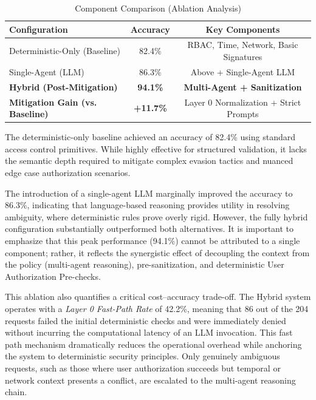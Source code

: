 \documentclass[
]{ceurart}
\begin{document}
\begin{table}[htbp]
    \centering
    \caption{Component Comparison (Ablation Analysis)}
    \label{tab:ablation}
    \begin{tabular}{lcc}
        \toprule
        \textbf{Configuration}        & \textbf{Accuracy} & \textbf{Key Components}          \\
        \midrule
        Deterministic-Only (Baseline) & 82.4\%            & RBAC, Time, Network, Basic Signatures \\
        Single-Agent (LLM)            & 86.3\%            & Above + Single-Agent LLM         \\
        \textbf{Hybrid (Post-Mitigation)} & \textbf{94.1\%}   & \textbf{Multi-Agent + Sanitization} \\
        \midrule
        \textbf{Mitigation Gain (vs. Baseline)} & \textbf{+11.7\%} & Layer 0 Normalization + Strict Prompts \\
        \bottomrule
    \end{tabular}
\end{table}

The deterministic-only baseline achieved an accuracy of 82.4\% using standard access control primitives. While highly effective for structured validation, it lacks the semantic depth required to mitigate complex evasion tactics and nuanced edge case authorization scenarios.

The introduction of a single-agent LLM marginally improved the accuracy to 86.3\%, indicating that language-based reasoning provides utility in resolving ambiguity, where deterministic rules prove overly rigid. However, the fully hybrid configuration substantially outperformed both alternatives. It is important to emphasize that this peak performance (94.1\%) cannot be attributed to a single component; rather, it reflects the synergistic effect of decoupling the context from the policy (multi-agent reasoning), pre-sanitization, and deterministic User Authorization Pre-checks.

This ablation also quantifies a critical cost--accuracy trade-off. The Hybrid system operates with a \textit{Layer 0 Fast-Path Rate} of 42.2\%, meaning that 86 out of the 204 requests failed the initial deterministic checks and were immediately denied without incurring the computational latency of an LLM invocation. This fast path mechanism dramatically reduces the operational overhead while anchoring the system to deterministic security principles. Only genuinely ambiguous requests, such as those where user authorization succeeds but temporal or network context presents a conflict, are escalated to the multi-agent reasoning chain.
\end{document}
